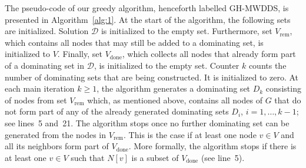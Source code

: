 \documentclass[algorithms,article,accept,moreauthors,pdftex]{Definitions/mdpi}
\begin{document}
The pseudo-code of our greedy algorithm, henceforth labelled GH-MWDDS, is presented in Algorithm~\ref{alg:1}. At the start of the algorithm, the following sets are initialized. Solution $\mathcal{D}$ is initialized to the empty set. Furthermore, set $V_{\mathrm{rem}}$, which contains all nodes that may still be added to a dominating set, is initialized to $V$. Finally, set $V_{\mathrm{done}}$, which collects all nodes that already form part of a dominating set in $\mathcal{D}$, is initialized to the empty set. Counter $k$ counts the number of dominating sets that are being constructed. It is initialized to zero. At each main iteration $k \geq 1$, the algorithm generates a dominating set $D_k$ consisting of nodes from set $V_{\mathrm{rem}}$ which, as mentioned above, contains all nodes of $G$ that do not form part of any of the already generated dominating sets $D_i$, $i=1,\ldots, k - 1$; see lines~5 and~21. The algorithm stops once no further dominating set can be generated from the nodes in $V_{\mathrm{rem}}$. This is the case if at least one node $v \in V$ and all its neighbors form part of $V_{\mathrm{done}}$. More formally, the algorithm stops if there is at least one $v \in V$ such that $N[v]$ is a subset of $V_{\mathrm{done}}$ (see line~5).
\end{document}
